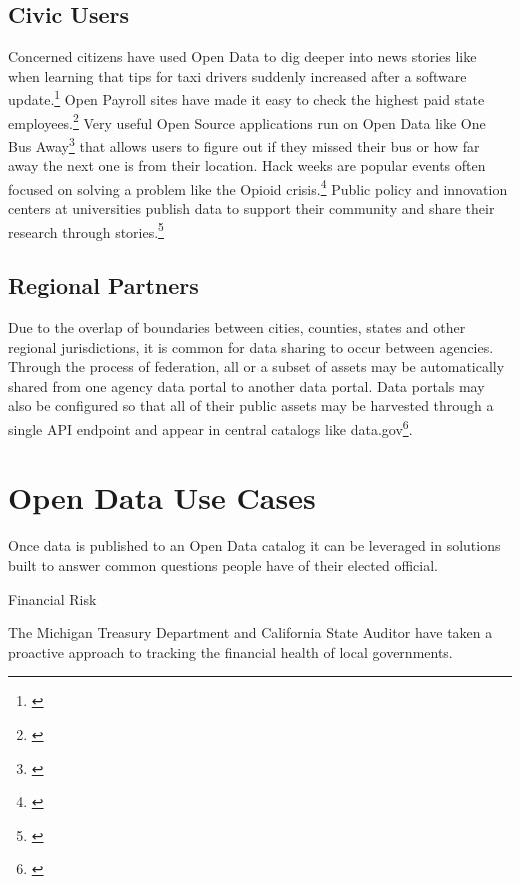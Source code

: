 \documentclass[
  openany]{book}
\begin{document}
\hypertarget{civic-users}{%
\subsection{Civic Users}\label{civic-users}}

Concerned citizens have used Open Data to dig deeper into news stories like when learning that tips for taxi drivers suddenly increased after a software update.\footnote{\citet{iquantny2020}} Open Payroll sites have made it easy to check the highest paid state employees.\footnote{\citet{ctpayroll2019}} Very useful Open Source applications run on Open Data like One Bus Away\footnote{\citet{soundtransitdata}} that allows users to figure out if they missed their bus or how far away the next one is from their location. Hack weeks are popular events often focused on solving a problem like the Opioid crisis.\footnote{\citet{doi:10.1080/14659891.2020.1753833}} Public policy and innovation centers at universities publish data to support their community and share their research through stories.\footnote{\citet{ndsc}}

\hypertarget{regional-partners}{%
\subsection{Regional Partners}\label{regional-partners}}

Due to the overlap of boundaries between cities, counties, states and other regional jurisdictions, it is common for data sharing to occur between agencies. Through the process of federation, all or a subset of assets may be automatically shared from one agency data portal to another data portal. Data portals may also be configured so that all of their public assets may be harvested through a single API endpoint and appear in central catalogs like data.gov\footnote{\citet{datagov}}.

\hypertarget{open-data-use-cases}{%
\section{Open Data Use Cases}\label{open-data-use-cases}}

Once data is published to an Open Data catalog it can be leveraged in solutions built to answer common questions people have of their elected official.

Financial Risk

The Michigan Treasury Department and California State Auditor have taken a proactive approach to tracking the financial health of local governments.
\end{document}
